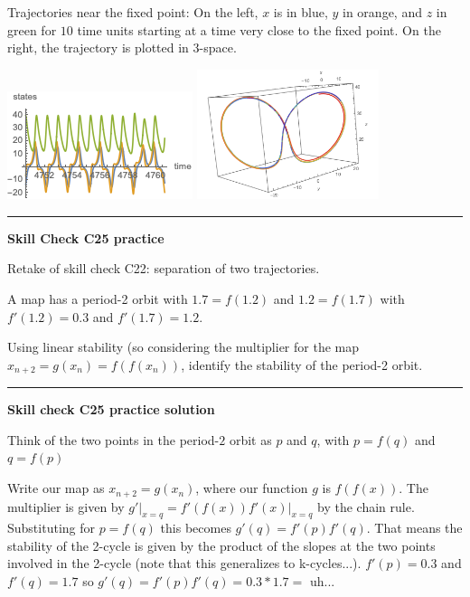 \documentclass[12pt,letterpaper,noanswers]{exam}
\begin{document}
Trajectories near the fixed point: On the left, $x$ is in blue, $y$ in orange, and $z$ in green for $10$ time units starting at a time very close to the fixed point.  On the right, the trajectory is plotted in $3$-space.

\includegraphics{img/191104-C25p2.png}
\includegraphics[width=0.4\textwidth]{img/191104-C25p3.png}

\vspace{0.2cm}
\hrule
\vspace{0.2cm}

\noindent\textbf{Skill Check C25 practice}
\begin{questions}
\item Retake of skill check C22: separation of two trajectories.

\item A map has a period-2 orbit with $1.7 = f(1.2)$ and $1.2 = f(1.7)$ with $f'(1.2) = 0.3$ and $f'(1.7) = 1.2$.

Using linear stability (so considering the  multiplier for the map $x_{n+2} = g(x_n) = f(f(x_n))$, identify the stability of the period-2 orbit.

\end{questions}

\vspace{0.2cm}

\hrule
\vspace{0.2cm}

\noindent\textbf{Skill check C25 practice solution}

Think of the two points in the period-$2$ orbit as $p$ and $q$, with $p = f(q)$ and $q = f(p)$

Write our map as $x_{n+2} = g(x_n)$, where our function $g$ is $f(f(x))$.  The multiplier is given by $\left.g'\right\vert_{x=q} = \left.f'(f(x))f'(x)\right\vert_{x=q}$ by the chain rule.  Substituting for $p = f(q)$ this becomes $g'(q) = f'(p)f'(q)$.  That means the stability of the 2-cycle is given by the product of the slopes at the two points involved in the 2-cycle (note that this generalizes to k-cycles...).  $f'(p) = 0.3$ and $f'(q) = 1.7$ so $g'(q) = f'(p)f'(q) = 0.3*1.7 = $ uh...
\end{document}
